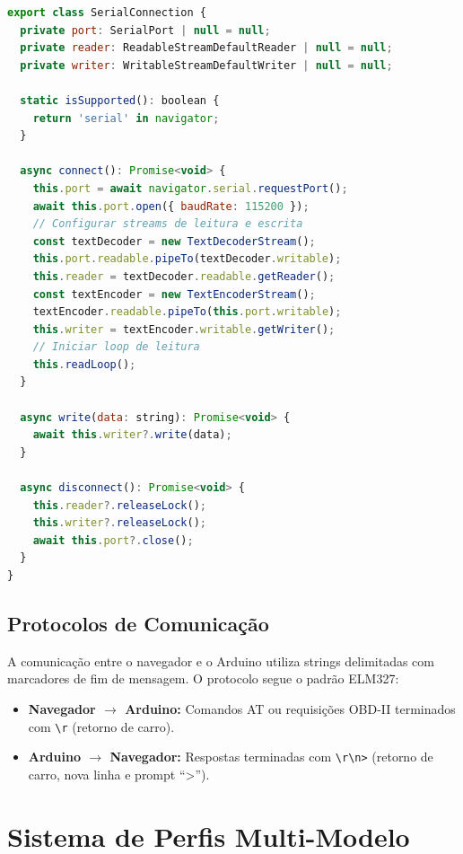 \begin{lstlisting}[language=JavaScript, caption={Classe de conexão serial simplificada.}, label={lst:serial-connection}]
export class SerialConnection {
  private port: SerialPort | null = null;
  private reader: ReadableStreamDefaultReader | null = null;
  private writer: WritableStreamDefaultWriter | null = null;

  static isSupported(): boolean {
    return 'serial' in navigator;
  }

  async connect(): Promise<void> {
    this.port = await navigator.serial.requestPort();
    await this.port.open({ baudRate: 115200 });
    // Configurar streams de leitura e escrita
    const textDecoder = new TextDecoderStream();
    this.port.readable.pipeTo(textDecoder.writable);
    this.reader = textDecoder.readable.getReader();
    const textEncoder = new TextEncoderStream();
    textEncoder.readable.pipeTo(this.port.writable);
    this.writer = textEncoder.writable.getWriter();
    // Iniciar loop de leitura
    this.readLoop();
  }

  async write(data: string): Promise<void> {
    await this.writer?.write(data);
  }

  async disconnect(): Promise<void> {
    this.reader?.releaseLock();
    this.writer?.releaseLock();
    await this.port?.close();
  }
}
\end{lstlisting}

\subsection{Protocolos de Comunicação}

A comunicação entre o navegador e o Arduino utiliza strings delimitadas com marcadores de fim de mensagem. O protocolo segue o padrão ELM327:

\begin{itemize}
    \item \textbf{Navegador $\rightarrow$ Arduino:} Comandos AT ou requisições OBD-II terminados com \texttt{\textbackslash r} (retorno de carro).
    \item \textbf{Arduino $\rightarrow$ Navegador:} Respostas terminadas com \texttt{\textbackslash r\textbackslash n>} (retorno de carro, nova linha e prompt ``>'').
\end{itemize}

\section{Sistema de Perfis Multi-Modelo}
\label{sec:perfis}

